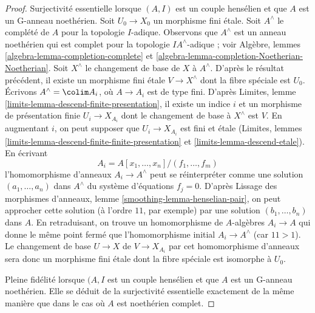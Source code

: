 \begin{proof}
\medskip\noindent
Surjectivité essentielle lorsque $(A, I)$ est un couple hensélien
et que $A$ est un G-anneau noethérien.
Soit $U_0 \to X_0$ un morphisme fini étale.
Soit $A^\wedge$ le complété de $A$ pour la topologie $I$-adique.
Observons que $A^\wedge$ est un anneau noethérien qui est
complet pour la topologie $IA^\wedge$-adique ; voir Algèbre, lemmes
\ref{algebra-lemma-completion-complete} et
\ref{algebra-lemma-completion-Noetherian-Noetherian}.
Soit $X^\wedge$ le changement de base de $X$ à $A^\wedge$.
D'après le résultat précédent, il existe un morphisme fini étale
$V \to X^\wedge$ dont la fibre spéciale est $U_0$.
Écrivons $A^\wedge = \colim A_i$, où $A \to A_i$ est de type fini.
D'après Limites, lemme \ref{limits-lemma-descend-finite-presentation},
il existe un indice $i$ et un morphisme de présentation finie $U_i \to X_{A_i}$
dont le changement de base à $X^\wedge$ est $V$. En augmentant $i$,
on peut supposer que $U_i \to X_{A_i}$ est fini et étale
(Limites, lemmes \ref{limits-lemma-descend-finite-finite-presentation} et
\ref{limits-lemma-descend-etale}). En écrivant
$$
A_i = A[x_1, \ldots, x_n]/(f_1, \ldots, f_m)
$$
l'homomorphisme d'anneaux $A_i \to A^\wedge$ peut se réinterpréter comme une solution
$(a_1, \ldots, a_n)$ dans $A^\wedge$ du système d'équations $f_j = 0$.
D'après Lissage des morphismes d'anneaux, lemme \ref{smoothing-lemma-henselian-pair},
on peut approcher cette solution (à l'ordre $11$, par exemple) par une solution
$(b_1, \ldots, b_n)$ dans $A$. En retraduisant, on trouve un homomorphisme de $A$-algèbres
$A_i \to A$ qui donne le même point fermé que l'homomorphisme initial
$A_i \to A^\wedge$ (car $11 > 1$). Le changement de base $U \to X$ de $V \to X_{A_i}$
par cet homomorphisme d'anneaux sera donc un morphisme fini étale dont la
fibre spéciale est isomorphe à $U_0$.

\medskip\noindent
Pleine fidélité lorsque $(A, I$ est un couple hensélien et que $A$ est un
G-anneau noethérien. Elle se déduit de la surjectivité essentielle exactement de la même
manière que dans le cas où $A$ est noethérien complet.


\end{proof}
